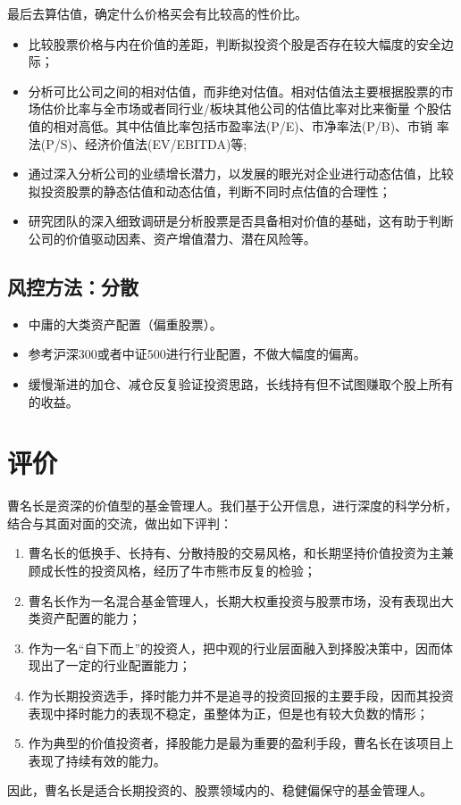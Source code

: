 \documentclass[hyperref,]{ctexart}
\providecommand{\tightlist}{%
  \setlength{\itemsep}{0pt}\setlength{\parskip}{0pt}}
\begin{document}
最后去算估值，确定什么价格买会有比较高的性价比。

\begin{itemize}
\tightlist
\item
  比较股票价格与内在价值的差距，判断拟投资个股是否存在较大幅度的安全边际；
\item
  分析可比公司之间的相对估值，而非绝对估值。相对估值法主要根据股票的市场估价比率与全市场或者同行业/板块其他公司的估值比率对比来衡量
  个股估值的相对高低。其中估值比率包括市盈率法(P/E)、市净率法(P/B)、市销
  率法(P/S)、经济价值法(EV/EBITDA)等;
\item
  通过深入分析公司的业绩增长潜力，以发展的眼光对企业进行动态估值，比较拟投资股票的静态估值和动态估值，判断不同时点估值的合理性；
\item
  研究团队的深入细致调研是分析股票是否具备相对价值的基础，这有助于判断公司的价值驱动因素、资产增值潜力、潜在风险等。
\end{itemize}

\subsection{风控方法：分散}

\begin{itemize}
\tightlist
\item
  中庸的大类资产配置（偏重股票）。
\item
  参考沪深300或者中证500进行行业配置，不做大幅度的偏离。
\item
  缓慢渐进的加仓、减仓反复验证投资思路，长线持有但不试图赚取个股上所有的收益。
\end{itemize}

\section{评价}

曹名长是资深的价值型的基金管理人。我们基于公开信息，进行深度的科学分析，结合与其面对面的交流，做出如下评判：

\begin{enumerate}
\def\labelenumi{\arabic{enumi}.}
\tightlist
\item
  曹名长的低换手、长持有、分散持股的交易风格，和长期坚持价值投资为主兼顾成长性的投资风格，经历了牛市熊市反复的检验；
\item
  曹名长作为一名混合基金管理人，长期大权重投资与股票市场，没有表现出大类资产配置的能力；
\item
  作为一名``自下而上''的投资人，把中观的行业层面融入到择股决策中，因而体现出了一定的行业配置能力；
\item
  作为长期投资选手，择时能力并不是追寻的投资回报的主要手段，因而其投资表现中择时能力的表现不稳定，虽整体为正，但是也有较大负数的情形；
\item
  作为典型的价值投资者，择股能力是最为重要的盈利手段，曹名长在该项目上表现了持续有效的能力。
\end{enumerate}

因此，曹名长是适合长期投资的、股票领域内的、稳健偏保守的基金管理人。
\end{document}
